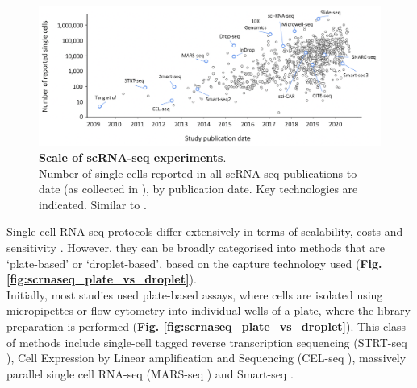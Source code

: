 \begin{figure}[h]
\centering
\includegraphics[width=16cm]{Chapter3/Fig/scrnaseq_ncells.png}
\caption[scRNA-seq technologies]{\textbf{Scale of scRNA-seq experiments}.\\
Number of single cells reported in all scRNA-seq publications to date (as collected in \cite{svensson2020single}), by publication date.
Key technologies are indicated.
Similar to \cite{svensson2018exponential}.}
\label{fig:scrnaseq_technologies}
\end{figure}

Single cell RNA-seq protocols differ extensively in terms of scalability, costs and sensitivity 
\cite{ziegenhain2017comparative, svensson2018exponential}.
However, they can be broadly categorised into methods that are 
`plate-based' or `droplet-based', based on the capture technology used
(\textbf{Fig. \ref{fig:scrnaseq_plate_vs_droplet}}).\\

Initially, most studies used plate-based assays, where cells are isolated using micropipettes or flow cytometry into individual wells of a plate, where the library preparation is performed (\textbf{Fig. \ref{fig:scrnaseq_plate_vs_droplet}}).
This class of methods include single-cell tagged reverse transcription sequencing (STRT-seq \cite{islam2011characterization}), Cell Expression by Linear amplification and Sequencing (CEL-seq \cite{hashimshony2012cel}), massively parallel single cell RNA-seq (MARS-seq \cite{jaitin2014massively}) and Smart-seq \cite{ramskold2012full, picelli2013smart, hagemann2020single}. 
\\

